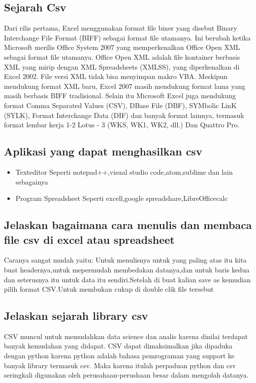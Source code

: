 \subsection{Sejarah Csv}
Dari rilis pertama, Excel menggunakan format file biner yang disebut Binary Interchange File Format (BIFF) sebagai format file utamanya. Ini berubah ketika Microsoft merilis Office System 2007 yang memperkenalkan Office Open XML sebagai format file utamanya. Office Open XML adalah file kontainer berbasis XML yang mirip dengan XML Spreadsheets (XMLSS), yang diperkenalkan di Excel 2002. File versi XML tidak bisa menyimpan makro VBA. Meskipun mendukung format XML baru, Excel 2007 masih mendukung format lama yang masih berbasis BIFF tradisional. Selain itu Microsoft Excel juga mendukung format Comma Separated Values (CSV), DBase File (DBF), SYMbolic LinK (SYLK), Format Interchange Data (DIF) dan banyak format lainnya, termasuk format lembar kerja 1-2 Lotus - 3 (WKS, WK1, WK2, dll.) Dan Quattro Pro.

\subsection{Aplikasi yang dapat menghasilkan csv}
\begin{itemize}
\item Texteditor
Seperti notepad++,visual studio code,atom,sublime dan lain sebagainya
\item Program Spreadsheet
  Seperti excell,google spreadshare,LibreOfficecalc
 \end{itemize}
\subsection{Jelaskan bagaimana cara menulis dan membaca file csv di excel atau spreadsheet}
Caranya sangat mudah yaitu:
 Untuk menulisnya untuk yang paling atas itu kita buat headernya,untuk mepermudah membedakan datanya,dan untuk baris kedua dan seterusnya itu untuk data itu sendiri.Setelah di buat kalian save as kemudian pilih format CSV.Untuk membukan cukup di double clik file tersebut
\subsection{Jelaskan sejarah library csv}
CSV muncul untuk memudahkan data science dan analis karena dinilai terdapat banyak kemudahan yang didapat. CSV dapat dimaksimalkan jika dipaduka dengan python karena python adalah bahasa pemrograman yang support ke banyak library termasuk csv. Maka karena itulah perpaduan python dan csv seringkali digunakan oleh perusahaan-perushaan besar dalam mengolah datanya.
